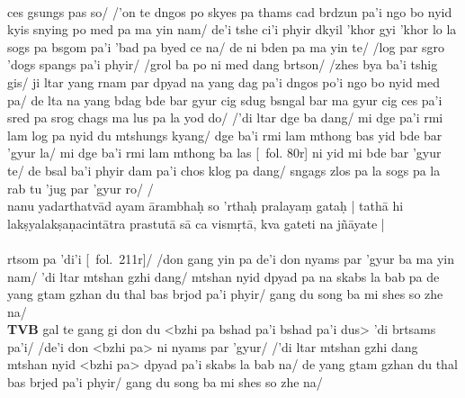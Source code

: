 \documentclass[12pt]{article}
\begin{document}
\textbf{\TVB}\\
ces gsungs pas so/ /'on te dngos po skyes pa thams cad brdzun pa'i ngo bo nyid kyis snying po med pa ma yin nam/ de'i tshe ci'i phyir dkyil 'khor gyi 'khor lo la sogs pa bsgom pa'i 'bad pa byed ce na/ de ni bden pa ma yin te/ /log par sgro 'dogs spangs pa'i phyir/ /grol ba po ni med dang brtson/ /zhes bya ba'i tshig gis/ ji ltar yang rnam par dpyad na yang dag pa'i dngos po'i ngo bo nyid med pa/ de lta na yang bdag bde bar gyur cig sdug bsngal bar ma gyur cig ces pa'i sred pa srog chags ma lus pa la yod do/ /'di ltar dge ba dang/ mi dge pa'i rmi lam log pa nyid du mtshungs kyang/ dge ba'i rmi lam mthong bas yid bde bar 'gyur la/ mi dge ba'i rmi lam mthong ba las [\TVB\ fol. 80r] ni yid mi bde bar 'gyur te/ de bsal ba'i phyir dam pa'i chos klog pa dang/ sngags zlos pa la sogs pa la rab tu 'jug par 'gyur ro/ /\\

nanu yadarthatvād ayam ārambhaḥ so 'rthaḥ pralayaṃ gataḥ | tathā hi lakṣyalakṣaṇacintātra prastutā sā ca vismṛtā, kva gateti na jñāyate |\\

\textbf{\TVA}\\
rtsom pa 'di'i [\TVA\ fol.\ 211r]/ /don gang yin pa de'i don nyams par 'gyur ba ma yin nam/ 'di ltar mtshan gzhi dang/ mtshan nyid dpyad pa na skabs la bab pa de yang gtam gzhan du thal bas brjod pa'i phyir/ gang du song ba mi shes so zhe na/ \\

\textbf{TVB}
gal te gang gi don du <bzhi pa bshad pa'i bshad pa'i dus> 'di brtsams pa'i/ /de'i don <bzhi pa> ni nyams par 'gyur/ /'di ltar mtshan gzhi dang mtshan nyid <bzhi pa> dpyad pa'i skabs la bab na/ de yang gtam gzhan du thal bas brjed pa'i phyir/ gang du song ba mi shes so zhe na/\\
\end{document}
